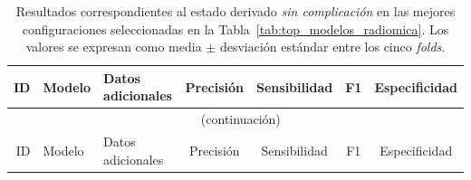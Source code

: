 \begin{landscape}
\begingroup
\scriptsize
\setlength{\tabcolsep}{3pt}

\begin{longtable}{rllcccc}
\caption{Resultados correspondientes al estado derivado \emph{sin complicación} en las mejores configuraciones seleccionadas en la Tabla~\ref{tab:top_modelos_radiomica}. Los valores se expresan como media $\pm$ desviación estándar entre los cinco \textit{folds}.}
\label{tab:radiomica_sin_complicacion_derivada}\\
\toprule
ID & Modelo & Datos adicionales & Precisión & Sensibilidad & F1 & Especificidad \\
\midrule
\endfirsthead

\multicolumn{7}{c}{\tablename\ \thetable{} (continuación)} \\
\toprule
ID & Modelo & Datos adicionales & Precisión & Sensibilidad & F1 & Especificidad \\
\midrule
\endhead


\end{longtable}
\end{landscape}

